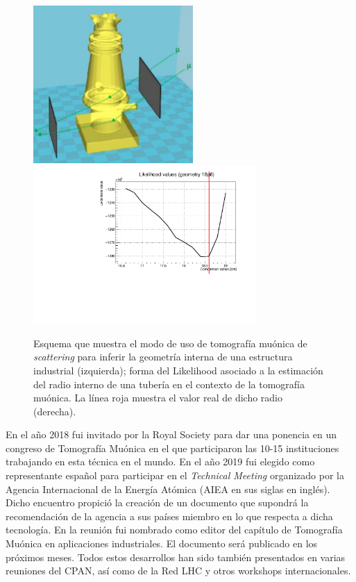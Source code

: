 \begin{figure}[ht]
\centering
\includegraphics[height=6cm]{fig/muontomography.png}
\includegraphics[height=6cm]{fig/likelihood18p6.pdf}
\caption{Esquema que muestra el modo de uso de tomografía muónica de \emph{scattering} para inferir la geometría interna de una estructura industrial (izquierda); forma del Likelihood asociado a la estimación del radio interno de una tubería en el contexto de la tomografía muónica. La línea roja muestra el valor real de dicho radio (derecha).}
\label{fig:tomography}
\end{figure} 



En el año 2018 fui invitado por la Royal Society para dar una ponencia en un congreso de Tomografía Muónica en el que participaron las 10-15 instituciones trabajando en esta técnica en el mundo. En el año 2019 fui elegido como representante español para participar en el \emph{Technical Meeting} organizado por la Agencia Internacional de la Energía Atómica (AIEA en sus siglas en inglés). Dicho encuentro propició la creación de un documento que supondrá la recomendación de la agencia a sus países miembro en lo que respecta a dicha tecnología. En la reunión fui nombrado como editor del capítulo de Tomografía Muónica en aplicaciones industriales. El documento será publicado en los próximos meses. Todos estos desarrollos han sido también presentados en varias reuniones del CPAN, así como de la Red LHC y otros workshops internacionales.   


